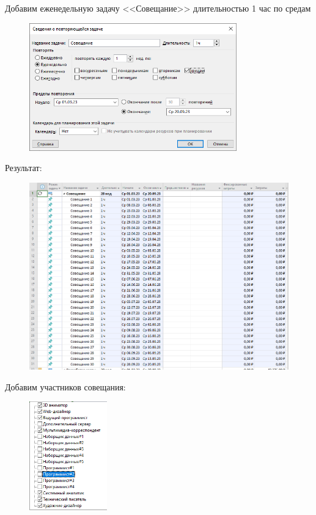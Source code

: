 Добавим еженедельную задачу <<Совещание>> длительностью 1 час по средам

\begin{figure}[H]
	\begin{center}
		\includegraphics[width=0.8\textwidth]{imgs/task_2_0.png}
	\end{center}
\end{figure}

Результат:

\begin{figure}[H]
	\begin{center}
		\includegraphics[width=\textwidth]{imgs/task_2_1.png}
	\end{center}
\end{figure}

Добавим участников совещания:

\begin{figure}[H]
	\begin{center}
		\includegraphics[width=0.3\textwidth]{imgs/task_2_2.png}
	\end{center}
\end{figure}

